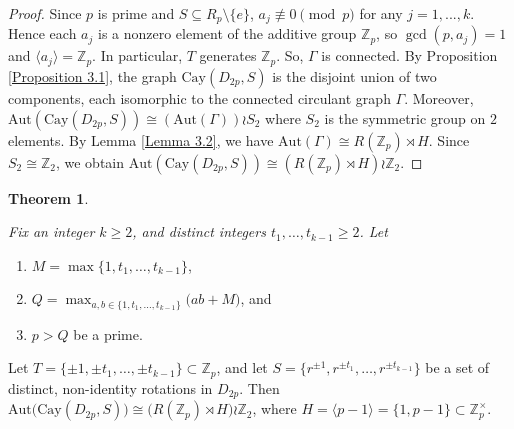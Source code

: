 \documentclass[12pt,reqno,a4paper]{amsart}
\theoremstyle{definition}
\newtheorem{thm}[defn]{Theorem}
\begin{document}
\begin{proof}
Since \(p\) is prime and \(S\subseteq R_{p}\setminus\{e\}\), $a_j\not\equiv 0 \pmod p$ for any $j=1,...,k$. Hence each \(a_j\) is a nonzero element of the additive group \(\mathbb Z_p\), so \(\gcd(p,a_j)=1\) and \(\langle a_j\rangle=\mathbb Z_p\).  In particular, \(T\) generates \(\mathbb Z_p\).  So, $\Gamma$ is connected.
By Proposition \ref{Proposition 3.1}, the graph $\mathrm{Cay}(D_{2p},S)$ is the disjoint union of two components, each isomorphic to the connected circulant graph $\Gamma$.
Moreover,
$\mathrm{Aut}(\mathrm{Cay}(D_{2p},S))\cong (\mathrm{Aut}(\Gamma))\wr S_2$ where $S_{2}$ is the symmetric group on $2$ elements.
By Lemma \ref{Lemma 3.2}, we have $\mathrm{Aut}(\Gamma)\cong R(\mathbb{Z}_p)\rtimes H$.
Since $S_2\cong \mathbb{Z}_2$, we obtain 
$\mathrm{Aut}(\mathrm{Cay}(D_{2p},S))\cong (R(\mathbb{Z}_p)\rtimes H)\wr \mathbb{Z}_2$.
 \end{proof}
\begin{thm}\label{Theorem 3.7}
{\em
Fix an integer $k\ge 2$, and distinct integers $t_1,\dots,t_{k-1}\ge 2$.
Let 
\begin{enumerate}
    \item $M=\max\{1,t_1,\dots,t_{k-1}\}$, 
    \item $Q=\max_{a,b\in\{1,t_1,\dots,t_{k-1}\}} \bigl( a b + M \bigr)$, and
    \item $p>Q$ be a prime.
\end{enumerate}
 
Let $T=\{\pm 1, \pm t_{1},\dots,\pm t_{k-1}\}\subset \mathbb{Z}_p$, and let $S=\{r^{\pm 1}, r^{\pm t_1},\dots,r^{\pm t_{k-1}}\}$ be a set of distinct, non-identity rotations in $D_{2p}$.
Then $\mathrm{Aut}\bigl(\mathrm{Cay}(D_{2p},S)\bigr) \cong \bigl(R(\mathbb{Z}_p)\rtimes H\bigr)\wr \mathbb{Z}_2$,
where $H=\langle p-1\rangle=\{1,p-1\}\subset\mathbb{Z}_p^\times$.


}
\end{thm}
\end{document}
